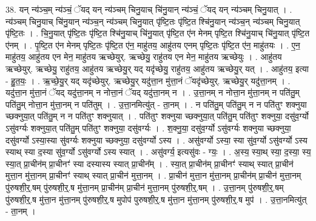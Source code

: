 \documentclass[17pt]{extarticle}
\begin{document}
38. यन् न्य॑ञ्च॒म् न्य॑ञ्चं॒ ॅयद् यन् न्य॑ञ्चम् चिनु॒याच् चि॑नु॒यान् न्य॑ञ्चं॒ ॅयद् यन् न्य॑ञ्चम् चिनु॒यात् । . न्य॑ञ्चम् चिनु॒याच् चि॑नु॒यान् न्य॑ञ्च॒न् न्य॑ञ्चम् चिनु॒यात् पृ॑ष्टि॒तः पृ॑ष्टि॒त श्चि॑नु॒यान् न्य॑ञ्च॒न् न्य॑ञ्चम् चिनु॒यात् पृ॑ष्टि॒तः । . चि॒नु॒यात् पृ॑ष्टि॒तः पृ॑ष्टि॒त श्चि॑नु॒याच् चि॑नु॒यात् पृ॑ष्टि॒त ए॑न मेनम् पृष्टि॒त श्चि॑नु॒याच् चि॑नु॒यात् पृ॑ष्टि॒त ए॑नम् । . पृ॒ष्टि॒त ए॑न मेनम् पृष्टि॒तः पृ॑ष्टि॒त ए॑न॒ माहु॑तय॒ आहु॑तय एनम् पृष्टि॒तः पृ॑ष्टि॒त ए॑न॒ माहु॑तयः । . ए॒न॒ माहु॑तय॒ आहु॑तय एन मेन॒ माहु॑तय ऋच्छेयुर्. ऋच्छेयु॒ राहु॑तय एन मेन॒ माहु॑तय ऋच्छेयुः । . आहु॑तय ऋच्छेयुर्. ऋच्छेयु॒ राहु॑तय॒ आहु॑तय ऋच्छेयु॒र् यद् यदृ॑च्छेयु॒ राहु॑तय॒ आहु॑तय ऋच्छेयु॒र् यत् । . आहु॑तय॒ इत्या - हु॒त॒यः॒ । . ऋ॒च्छे॒यु॒र् यद् यदृ॑च्छेयुर्. ऋच्छेयु॒र् यदु॑त्ता॒न मु॑त्ता॒नं ॅयदृ॑च्छेयुर्. ऋच्छेयु॒र् यदु॑त्ता॒नम् । . यदु॑त्ता॒न मु॑त्ता॒नं ॅयद् यदु॑त्ता॒नम् न नोत्ता॒नं ॅयद् यदु॑त्ता॒नम् न । . उ॒त्ता॒नम् न नोत्ता॒न मु॑त्ता॒नम् न पति॑तु॒म् पति॑तु॒म् नोत्ता॒न मु॑त्ता॒नम् न पति॑तुम् । . उ॒त्ता॒नमित्यु॑त् - ता॒नम् । . न पति॑तु॒म् पति॑तु॒म् न न पति॑तुꣳ शक्नुया च्छक्नुया॒त् पति॑तु॒म् न न पति॑तुꣳ शक्नुयात् । . पति॑तुꣳ शक्नुया च्छक्नुया॒त् पति॑तु॒म् पति॑तुꣳ शक्नुया॒ दसु॑व॒र्ग्यो ऽसु॑वर्ग्यः शक्नुया॒त् पति॑तु॒म् पति॑तुꣳ शक्नुया॒ दसु॑वर्ग्यः । . श॒क्नु॒या॒ दसु॑व॒र्ग्यो ऽसु॑वर्ग्यः शक्नुया च्छक्नुया॒ दसु॑वर्ग्यो ऽस्या॒स्या सु॑वर्ग्यः शक्नुया च्छक्नुया॒ दसु॑वर्ग्यो ऽस्य । . असु॑वर्ग्यो ऽस्या॒ स्या सु॑व॒र्ग्यो ऽसु॑वर्ग्यो ऽस्य स्याथ् स्या द॒स्या सु॑व॒र्ग्यो ऽसु॑वर्ग्यो ऽस्य स्यात् । . असु॑वर्ग्य॒ इत्यसु॑वः - ग्यः॒ । . अ॒स्य॒ स्या॒थ् स्या॒ द॒स्या॒ स्य॒ स्या॒त् प्रा॒चीन॑म् प्रा॒चीनꣳ॑ स्या दस्यास्य स्यात् प्रा॒चीन᳚म् । . स्या॒त् प्रा॒चीन॑म् प्रा॒चीनꣳ॑ स्याथ् स्यात् प्रा॒चीन॑ मुत्ता॒न मु॑त्ता॒नम् प्रा॒चीनꣳ॑ स्याथ् स्यात् प्रा॒चीन॑ मुत्ता॒नम् । . प्रा॒चीन॑ मुत्ता॒न मु॑त्ता॒नम् प्रा॒चीन॑म् प्रा॒चीन॑ मुत्ता॒नम् पु॑रुषशी॒र्॒.षम् पु॑रुषशी॒र्॒.ष मु॑त्ता॒नम् प्रा॒चीन॑म् प्रा॒चीन॑ मुत्ता॒नम् पु॑रुषशी॒र्॒.षम् । . उ॒त्ता॒नम् पु॑रुषशी॒र्॒.षम् पु॑रुषशी॒र्॒.ष मु॑त्ता॒न मु॑त्ता॒नम् पु॑रुषशी॒र्॒.ष मुपोप॑ पुरुषशी॒र्॒.ष मु॑त्ता॒न मु॑त्ता॒नम् पु॑रुषशी॒र्॒.ष मुप॑ । . उ॒त्ता॒नमित्यु॑त् - ता॒नम् । \newline
\pagebreak
{}
\end{document}

